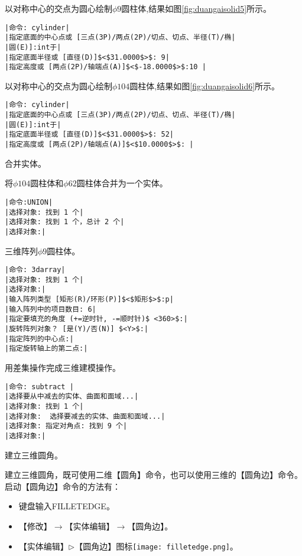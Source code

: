 \begin{procedure}
\begin{lstlisting}
\end{lstlisting}
以对称中心的交点为圆心绘制$\phi 9$圆柱体,结果如图\ref{fig:duangaisolid5}所示。
\begin{lstlisting}
|命令: cylinder|
|指定底面的中心点或 [三点(3P)/两点(2P)/切点、切点、半径(T)/椭|
|圆(E)]:int于|
|指定底面半径或 [直径(D)]$<$31.0000$>$: 9|
|指定高度或 [两点(2P)/轴端点(A)]$<$-18.0000$>$:10 |
\end{lstlisting}
以对称中心的交点为圆心绘制$\phi 104$圆柱体,结果如图\ref{fig:duangaisolid6}所示。
\begin{lstlisting}
|命令: cylinder|
|指定底面的中心点或 [三点(3P)/两点(2P)/切点、切点、半径(T)/椭|
|圆(E)]:int于|
|指定底面半径或 [直径(D)]$<$31.0000$>$: 52|
|指定高度或 [两点(2P)/轴端点(A)]$<$10.0000$>$: |
\end{lstlisting}
\item 合并实体。

将$\phi 104$圆柱体和$\phi 62$圆柱体合并为一个实体。
\begin{lstlisting}
|命令:UNION|
|选择对象: 找到 1 个|
|选择对象: 找到 1 个，总计 2 个|
|选择对象:|
\end{lstlisting}
\item 三维阵列$\phi 9$圆柱体。
\begin{lstlisting}
|命令: 3darray|
|选择对象: 找到 1 个|
|选择对象:|
|输入阵列类型 [矩形(R)/环形(P)]$<$矩形$>$:p|
|输入阵列中的项目数目: 6|
|指定要填充的角度 (+=逆时针, -=顺时针)$ <360>$:|
|旋转阵列对象？ [是(Y)/否(N)] $<Y>$:|
|指定阵列的中心点:|
|指定旋转轴上的第二点:|
\end{lstlisting}
\item 用差集操作完成三维建模操作。
\begin{lstlisting}
|命令: subtract |
|选择要从中减去的实体、曲面和面域...|
|选择对象: 找到 1 个|
|选择对象:  选择要减去的实体、曲面和面域...|
|选择对象: 指定对角点: 找到 9 个|
|选择对象:|
\end{lstlisting}
\item 建立三维圆角。

建立三维圆角，既可使用二维【圆角】命令，也可以使用三维的【圆角边】命令。启动【圆角边】命令的方法有：
\begin{itemize}
\item 键盘输入FILLETEDGE。
\item 【修改】$\rightarrow$【实体编辑】$\rightarrow$【圆角边】。
\item 【实体编辑】$\triangleright$【圆角边】图标\texttt{[image: filletedge.png]}。
\end{itemize} 


\end{procedure}
